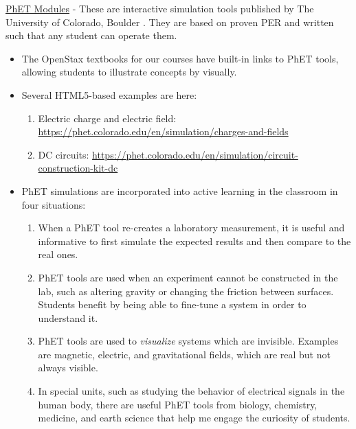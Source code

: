 \documentclass[../../../main.tex]{subfiles}
\begin{document}
\underline{PhET Modules} - These are interactive simulation tools published by The University of Colorado, Boulder \cite{phet}.  They are based on proven PER and written such that any student can operate them.
\begin{itemize}
\item The OpenStax textbooks for our courses have built-in links to PhET tools, allowing students to illustrate concepts by visually.
\item Several HTML5-based examples are here:
\begin{enumerate}
\item Electric charge and electric field: \url{https://phet.colorado.edu/en/simulation/charges-and-fields}
\item DC circuits: \url{https://phet.colorado.edu/en/simulation/circuit-construction-kit-dc}
\end{enumerate}
\item PhET simulations are incorporated into active learning in the classroom in four situations:
\begin{enumerate}
\item When a PhET tool re-creates a laboratory measurement, it is useful and informative to first simulate the expected results and then compare to the real ones.
\item PhET tools are used when an experiment cannot be constructed in the lab, such as altering gravity or changing the friction between surfaces.  Students benefit by being able to fine-tune a system in order to understand it.
\item PhET tools are used to \textit{visualize} systems which are invisible.  Examples are magnetic, electric, and gravitational fields, which are real but not always visible.
\item In special units, such as studying the behavior of electrical signals in the human body, there are useful PhET tools from biology, chemistry, medicine, and earth science that help me engage the curiosity of students.
\end{enumerate}
\end{itemize}
\end{document}
